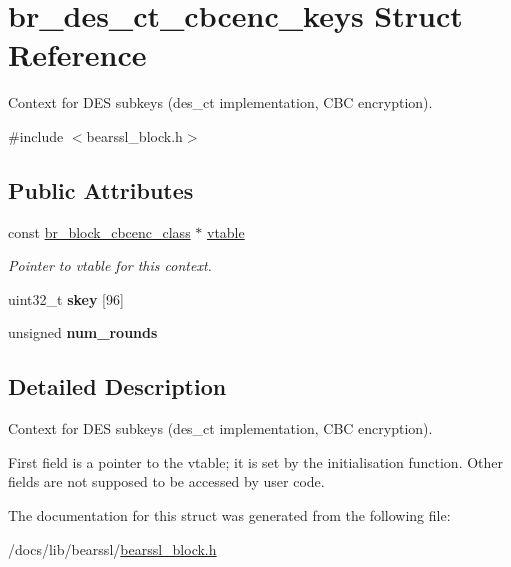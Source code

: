 \hypertarget{structbr__des__ct__cbcenc__keys}{}\section{br\+\_\+des\+\_\+ct\+\_\+cbcenc\+\_\+keys Struct Reference}
\label{structbr__des__ct__cbcenc__keys}


Context for D\+ES subkeys ({\ttfamily des\+\_\+ct} implementation, C\+BC encryption).  




{\ttfamily \#include $<$bearssl\+\_\+block.\+h$>$}

\subsection*{Public Attributes}
\begin{DoxyCompactItemize}
\item 
\mbox{\label{structbr__des__ct__cbcenc__keys_a037c84bcddac3d8ab80aabd8e27a1481}} 
const \hyperlink{bearssl__block_8h_ad0ecff523e21a74dc1143dcfa52aa251}{br\+\_\+block\+\_\+cbcenc\+\_\+class} $\ast$ \hyperlink{structbr__des__ct__cbcenc__keys_a037c84bcddac3d8ab80aabd8e27a1481}{vtable}
\begin{DoxyCompactList}\small\item\em Pointer to vtable for this context. \end{DoxyCompactList}\item 
\mbox{\label{structbr__des__ct__cbcenc__keys_a6ecad7373c4fd1208a831f62314743a3}} 
uint32\+\_\+t {\bfseries skey} \mbox{[}96\mbox{]}
\item 
\mbox{\label{structbr__des__ct__cbcenc__keys_ae8885444124eff00dbf31a8eaf4a4fbd}} 
unsigned {\bfseries num\+\_\+rounds}
\end{DoxyCompactItemize}


\subsection{Detailed Description}
Context for D\+ES subkeys ({\ttfamily des\+\_\+ct} implementation, C\+BC encryption). 

First field is a pointer to the vtable; it is set by the initialisation function. Other fields are not supposed to be accessed by user code. 

The documentation for this struct was generated from the following file\+:\begin{DoxyCompactItemize}
\item 
/docs/lib/bearssl/\hyperlink{bearssl__block_8h}{bearssl\+\_\+block.\+h}\end{DoxyCompactItemize}
